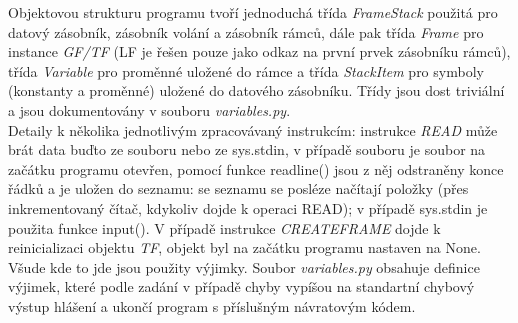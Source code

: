\documentclass[10pt]{article}
\begin{document}
Objektovou strukturu programu tvoří jednoduchá třída \textit{FrameStack} použitá pro datový zásobník, zásobník volání a zásobník rámců, dále pak třída \textit{Frame} pro instance \textit{GF/TF} (LF je řešen pouze jako odkaz na první prvek zásobníku rámců), třída \textit{Variable} pro proměnné uložené do rámce a třída \textit{StackItem} pro symboly (konstanty a proměnné) uložené do datového zásobníku. Třídy jsou dost triviální a jsou dokumentovány v souboru \textit{variables.py}.\\
Detaily k několika jednotlivým zpracovávaný instrukcím: instrukce \textit{READ} může brát data buďto ze souboru nebo ze sys.stdin, v případě souboru je soubor na začátku programu otevřen, pomocí funkce readline() jsou z něj odstraněny konce řádků a je uložen do seznamu: se seznamu se posléze načítají položky (přes inkrementovaný čítač, kdykoliv dojde k operaci READ); v případě sys.stdin je použita funkce input(). V případě instrukce \textit{CREATEFRAME} dojde k reinicializaci objektu \textit{TF}, objekt byl na začátku programu nastaven na None.\\
Všude kde to jde jsou použity výjimky. Soubor \textit{variables.py} obsahuje definice výjimek, které podle zadání v případě chyby vypíšou na standartní chybový výstup hlášení a ukončí program s příslušným návratovým kódem. 
\end{document}
